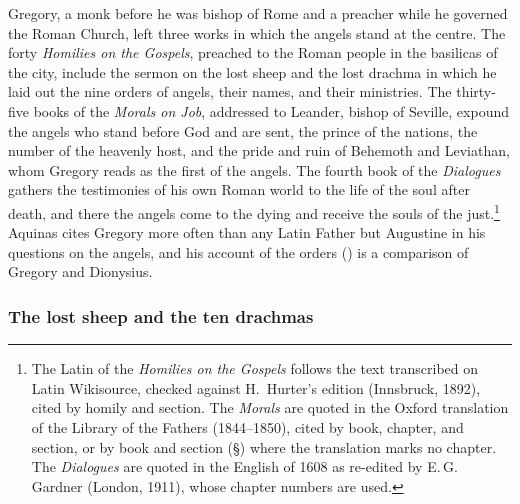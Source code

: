 Gregory, a monk before he was bishop of Rome and a preacher while he
governed the Roman Church, left three works in which the angels stand at the
centre. The forty \emph{Homilies on the Gospels}, preached to the Roman
people in the basilicas of the city, include the sermon on the lost sheep and
the lost drachma in which he laid out the nine orders of angels, their names,
and their ministries. The thirty-five books of the \emph{Morals on Job},
addressed to Leander, bishop of Seville, expound the angels who stand before
God and are sent, the prince of the nations, the number of the heavenly
host, and the pride and ruin of Behemoth and Leviathan, whom Gregory reads as
the first of the angels. The fourth book of the \emph{Dialogues} gathers
the testimonies of his own Roman world to the life of the soul after death,
and there the angels come to the dying and receive the souls of the
just.\footnote{The Latin of the \emph{Homilies on the Gospels} follows the
text transcribed on Latin Wikisource, checked against H.~Hurter's edition
(Innsbruck, 1892), cited by homily and section. The \emph{Morals} are quoted in the Oxford
translation of the Library of the Fathers (1844--1850), cited by book,
chapter, and section, or by book and section (\S) where the translation marks no chapter. The \emph{Dialogues} are quoted in the English of
1608 as re-edited by E.\,G. Gardner (London, 1911), whose chapter numbers are
used.} Aquinas cites Gregory more often than any Latin Father but Augustine
in his questions on the angels, and his account of the orders
() is a comparison of Gregory and Dionysius.

\subsubsection{The lost sheep and the ten drachmas}

